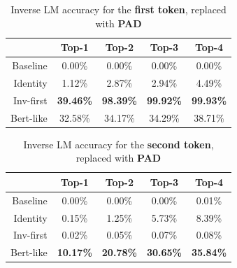 \documentclass[../thesis.tex]{subfiles}
\begin{document}
\begin{table}[bthp]
\centering
\begin{tabular}{rcccc}
\toprule
          & \textbf{Top-1}   & \textbf{Top-2}   & \textbf{Top-3}   & \textbf{Top-4}   \\
\midrule
Baseline  & 0.00\%           & 0.00\%           & 0.00\%           & 0.00\%           \\
Identity  & 1.12\%           & 2.87\%           & 2.94\%           & 4.49\%           \\
Inv-first & \textbf{39.46\%} & \textbf{98.39\%} & \textbf{99.92\%} & \textbf{99.93\%} \\
Bert-like & 32.58\%          & 34.17\%          & 34.29\%          & 38.71\%         \\
\bottomrule
\end{tabular}
\vspace{0.25cm}
\caption{Inverse LM accuracy for the \textbf{first token}, replaced with \textbf{PAD}}
\label{table:tinystories__inversion_first_token_pad}
\end{table}

\begin{table}[bthp]
\centering
\begin{tabular}{rcccc}
\toprule
          & \textbf{Top-1}   & \textbf{Top-2}   & \textbf{Top-3}   & \textbf{Top-4}   \\
\midrule
Baseline  & 0.00\%           & 0.00\%           & 0.00\%           & 0.01\%           \\
Identity  & 0.15\%           & 1.25\%           & 5.73\%           & 8.39\%           \\
Inv-first & 0.02\%           & 0.05\%           & 0.07\%           & 0.08\%           \\
Bert-like & \textbf{10.17\%} & \textbf{20.78\%} & \textbf{30.65\%} & \textbf{35.84\%} \\
\bottomrule
\end{tabular}
\vspace{0.25cm}
\caption{Inverse LM accuracy for the \textbf{second token}, replaced with \textbf{PAD}}
\label{table:tinystories__inversion_second_token_pad}
\end{table}
\end{document}
